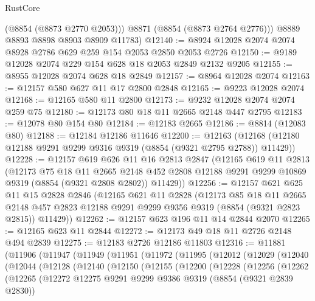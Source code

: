 \begin{lexlean}{RustCore}
\begin{coremodule}
          (@8854 (@8873 @2770 @2053)))
        @8871
        (@8854 (@8873 @2764 @2776)))
      @8889
      @8893
      @8898
      @8903
      @8909
      @11783)
@12140 := @8924 @12028 @2074 @2074 @8928 @2786 @629 @259 @154 @2053 @2850 @2053 @2726
@12150 := @9189 @12028 @2074 @229 @154 @628 @18 @2053 @2849 @2132 @9205
@12155 := @8955 @12028 @2074 @628 @18 @2849
@12157 := @8964 @12028 @2074
@12163 := @12157 @580 @627 @11 @17 @2800 @2848
@12165 := @9223 @12028 @2074
@12168 := @12165 @580 @11 @2800
@12173 := @9232 @12028 @2074 @2074 @259 @75
@12180 := @12173 @80 @18 @11 @2665 @2148 @447 @2795
@12183 := @12078 @80 @154 @80
@12184 := @12183 @2665
@12186 := @8814 (@12083 @80)
@12188 := @12184 @12186 @11646
@12200 := @12163 (@12168 (@12180 @12188 @9291 @9299 @9316 @9319 (@8854 (@9321 @2795 @2788)) @11429))
@12228 := @12157
    @619
    @626
    @11
    @16
    @2813
    @2847
    (@12165
      @619
      @11
      @2813
      (@12173
        @75
        @18
        @11
        @2665
        @2148
        @452
        @2808
        @12188
        @9291
        @9299
        @10869
        @9319
        (@8854 (@9321 @2808 @2802))
        @11429))
@12256 := @12157
    @621
    @625
    @11
    @15
    @2828
    @2846
    (@12165
      @621
      @11
      @2828
      (@12173
        @85
        @18
        @11
        @2665
        @2148
        @457
        @2823
        @12188
        @9291
        @9299
        @9356
        @9319
        (@8854 (@9321 @2823 @2815))
        @11429))
@12262 := @12157 @623 @196 @11 @14 @2844 @2070
@12265 := @12165 @623 @11 @2844
@12272 := @12173 @49 @18 @11 @2726 @2148 @494 @2839
@12275 := @12183 @2726 @12186 @11803
@12316 := @11881
    (@11906
      (@11947
        (@11949
          (@11951
            (@11972
              (@11995
                (@12012
                  (@12029
                    (@12040
                      (@12044
                        (@12128
                          (@12140
                            (@12150
                              (@12155
                                (@12200
                                  (@12228
                                    (@12256
                                      (@12262
                                        (@12265
                                          (@12272
                                            @12275
                                            @9291
                                            @9299
                                            @9386
                                            @9319
                                            (@8854 (@9321 @2839 @2830))

\end{coremodule}
\end{lexlean}
